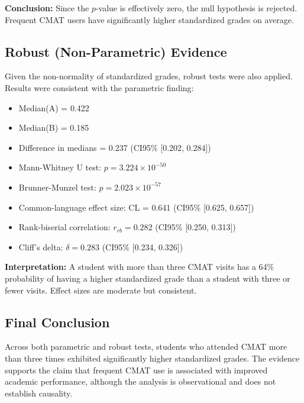 \documentclass[8pt,a4paper]{article} %
\numberwithin{figure}{subsection}
\begin{document}
\textbf{Conclusion:} Since the $p$-value is effectively zero, the null
hypothesis is rejected. Frequent CMAT users have significantly higher
standardized grades on average.

\subsection{Robust (Non-Parametric) Evidence}

Given the non-normality of standardized grades, robust tests were also
applied. Results were consistent with the parametric finding:

\begin{itemize}
  \item Median(A) = 0.422
  \item Median(B) = 0.185
  \item Difference in medians = 0.237 (CI95\% [0.202, 0.284])
  \item Mann-Whitney U test: $p = 3.224 \times 10^{-50}$
  \item Brunner-Munzel test: $p = 2.023 \times 10^{-57}$
  \item Common-language effect size: CL = 0.641 (CI95\% [0.625, 0.657])
  \item Rank-biserial correlation: $r_{rb} = 0.282$ (CI95\% [0.250, 0.313])
  \item Cliff’s delta: $\delta = 0.283$ (CI95\% [0.234, 0.326])
\end{itemize}

\textbf{Interpretation:}
A student with more than three CMAT visits has a 64\% probability of
having a higher standardized grade than a student with three or fewer
visits. Effect sizes are moderate but consistent.

\subsection{Final Conclusion}

Across both parametric and robust tests, students who attended CMAT
more than three times exhibited significantly higher standardized
grades. The evidence supports the claim that frequent CMAT use is
associated with improved academic performance, although the analysis
is observational and does not establish causality.
\end{document}
